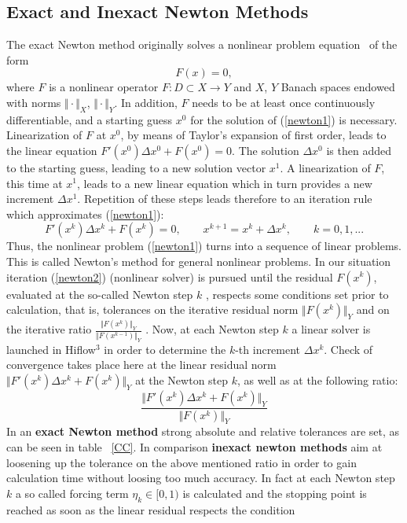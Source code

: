 \documentclass[a4paper, 11pt, twoside]{article}
\begin{document}
\subsection{Exact and Inexact Newton Methods} \label{theorie}
The exact Newton method originally solves a nonlinear problem  equation~\cite{newton:method} of the form 
\begin{equation} \label{newton1}
F(x)=0,
\end{equation}
where $F$ is a nonlinear operator $F: D \subset X \to Y$ and $X$, $Y$ Banach spaces endowed with norms $ \Vert \cdot \Vert_X$, $ \Vert \cdot \Vert_Y$. In addition, $F$ needs to be at least once continuously differentiable, and a starting guess $x^0$ for the solution of (\ref{newton1}) is necessary. Linearization of $F$ at $x^0$, by means of Taylor's expansion of first order, leads to the linear equation $F'(x^0) \Delta x^0 + F(x^0)=0$. The solution $\Delta x^0$ is then added to the starting guess, leading to a new solution vector $x^1$. A linearization of $F$, this time at $x^1$, leads to a new linear equation which in turn provides a new increment $\Delta x^1$. Repetition of these steps leads therefore to an iteration rule which approximates (\ref{newton1}):
\begin{equation} \label{newton2}
F'(x^k) \Delta x^k + F(x^k)=0, \qquad
x^{k+1}=x^k+\Delta x^k, \qquad k=0,1,...
\end{equation}
Thus, the nonlinear problem (\ref{newton1}) turns into a sequence of linear problems. This is called Newton's method for general nonlinear problems. In our situation iteration (\ref{newton2}) (nonlinear solver) is pursued until the residual  $F(x^k)$, evaluated at the so-called Newton step $k$ , respects some conditions set prior to calculation, that is, tolerances on the iterative residual norm $\Vert F(x^k)\Vert_Y$ and on the iterative ratio $\frac{\Vert F(x^k) \Vert_Y}{\Vert F(x^{k-1}) \Vert_Y}$ . Now, at each Newton step $k$ a linear solver  is launched in Hiflow$^3$ in order to determine the $k$-th increment $\Delta x^k$. Check of convergence takes place here at the linear residual  norm $\Vert F'(x^k) \Delta x^k + F(x^k) \Vert_Y$ at the Newton step $k$, as well as at the following ratio:
\begin{equation}\label{ratio}
\frac{\Vert F'(x^k) \Delta x^k + F(x^k)\Vert_Y}{\Vert F(x^k) \Vert_Y}
\end{equation}
In an \textbf{exact Newton method}  strong absolute and relative tolerances are set, as can be seen in table ~\ref{CC}. In comparison \textbf{inexact newton methods}  aim at loosening up the tolerance on the above mentioned ratio in order to gain calculation time without loosing too much accuracy. In fact at each Newton step $k$ a so called forcing term  $\eta_k \in \lbrack 0, 1)$ is calculated and the stopping point is reached as soon as the linear residual respects the condition
\end{document}
